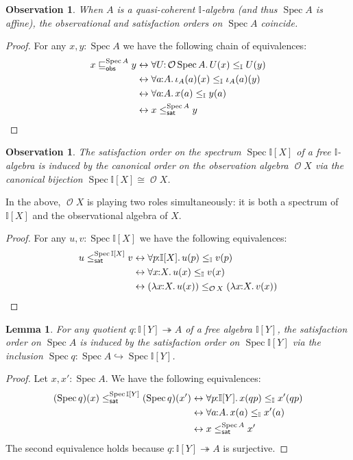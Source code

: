 \documentclass[a4paper,12pt]{amsart}
\newtheorem{lemma}[theorem]{Lemma}
\newtheorem{observation}[theorem]{Observation}
\theoremstyle{definition}
\newcommand{\mc}[1]{\mathcal{#1}}
\newcommand{\mbb}[1]{\mathbb{#1}}
\newcommand{\I}{\mbb I}
\newcommand{\surj}{\twoheadrightarrow}
\newcommand{\hook}{\hookrightarrow}
\newcommand{\fa}[2]{\forall #1\!\colon\!\!#2\mathpunct{.}}
\newcommand{\ld}[2]{\lambda #1\!\colon\!\!#2\mathpunct{.}}
\newcommand{\eq}{\leftrightarrow}
\newcommand{\spec}{\operatorname{Spec}}
\newcommand{\opens}{\operatorname{\mc{O}}} %
\begin{document}
\begin{observation}\label{lem:specorderofaffine}
  When $A$ is a quasi-coherent $\I$-algebra (and thus $\spec{A}$ is affine), the observational and satisfaction orders on $\spec{A}$ coincide.
\end{observation}
\begin{proof}
  For any $x,y:\spec{A}$ we have the following chain of equivalences:
  \begin{align*}
    x\obsle[\spec{A}] y 
    &\eq 
    \fa{U}{\opens{\spec{A}}} U(x) \le_{\I} U(y)
    \\ 
    &\eq 
    \fa{a}{A} 
    \iota_A(a)(x)
    \le_\I
    \iota_A(a)(y)
    \\ 
    &\eq 
    \fa{a}{A} 
    x(a)
    \le_\I
    y(a)
    \\ 
    &\eq 
    x\satle[\spec{A}] y
    \qedhere
  \end{align*}
\end{proof}

\begin{observation}
  The satisfaction order on the spectrum $\spec{\I[X]}$ of a free $\I$-algebra is induced by the canonical order on the \emph{observation algebra} $\opens{X}$ via the canonical bijection $\spec{\I[X]}\cong \opens{X}$.
\end{observation}

In the above, $\opens{X}$ is playing two roles simultaneously: it is both a spectrum of $\I[X]$ and the observational algebra of $X$.

\begin{proof}
  For any $u,v:\spec{\I[X]}$ we have the following equivalences:
  \begin{align*}
    u \satle[\spec{\I[X]}] v
    &\eq \fa{p}{\I[X]} u(p) \le_{\I} v(p)
    \\ 
    &\eq \fa{x}{X} u(x) \le_{\I} v(x)
    \\ 
    &\eq (\ld{x}{X}u(x)) \le_{\opens{X}} (\ld{x}{X}v(x))
    \qedhere
  \end{align*}
\end{proof}


\begin{lemma}\label{lem:cancoincide}
  For any quotient $q \colon \I[Y] \surj A$ of a free algebra $\I[Y]$, the satisfaction order on $\spec A$ is induced by the satisfaction order on $\spec{\I[Y]}$ via the inclusion ${\spec{q}}\colon\spec{A}\hook \spec{\I[Y]}$.
\end{lemma} 

\begin{proof}
  Let $x,x' : \spec A$. We have the following equivalences:
  \begin{align*}
    (\spec{q})(x)\satle[\spec{\I[Y]}] (\spec{q})(x')
    &\eq 
    \fa{p}{\I[Y]}
    x(qp) \le_\I x'(qp)
    \\ 
    &\eq 
    \fa{a}{A} x(a) \le_\I x'(a) 
    \\ 
    &\eq 
    x\satle[\spec{A}] x'
  \end{align*}
% 
  The second equivalence holds because $q\colon \I[Y]\surj A$ is surjective.
\end{proof}
\end{document}
